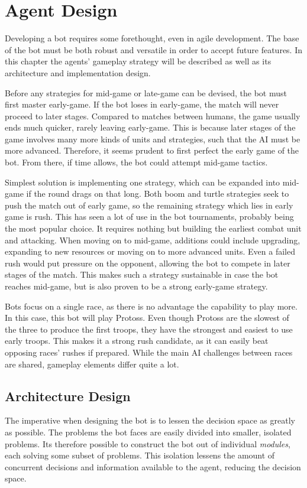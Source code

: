 \chapter{Agent Design}
Developing a bot requires some forethought, even in agile development. The base of the bot must be both robust and versatile in order to accept future features. In this chapter the agents' gameplay strategy will be described as well as its architecture and implementation design.

Before any strategies for mid-game or late-game can be devised, the bot must first master early-game. If the bot loses in early-game, the match will never proceed to later stages. Compared to matches between humans, the game usually ends much quicker, rarely leaving early-game. This is because later stages of the game involves many more kinds of units and strategies, such that the AI must be more advanced. Therefore, it seems prudent to first perfect the early game of the bot. From there, if time allows, the bot could attempt mid-game tactics.

Simplest solution is implementing one strategy, which can be expanded into mid-game if the round drags on that long. Both boom and turtle strategies seek to push the match out of early game, so the remaining strategy which lies in early game is rush. This has seen a lot of use in the bot tournaments, probably being the most popular choice. It requires nothing but building the earliest combat unit and attacking. When moving on to mid-game, additions could include upgrading, expanding to new resources or moving on to more advanced units. Even a failed rush would put pressure on the opponent, allowing the bot to compete in later stages of the match. This makes such a strategy sustainable in case the bot reaches mid-game, but is also proven to be a strong early-game strategy.

Bots focus on a single race, as there is no advantage the capability to play more. In this case, this bot will play Protoss. Even though Protoss are the slowest of the three to produce the first troops, they have the strongest and easiest to use early troops. This makes it a strong rush candidate, as it can easily beat opposing races' rushes if prepared. While the main AI challenges between races are shared, gameplay elements differ quite a lot.

\section{Architecture Design}
The imperative when designing the bot is to lessen the decision space as greatly as possible. The problems the bot faces are easily divided into smaller, isolated problems. Its therefore possible to construct the bot out of individual \emph{modules}, each solving some subset of problems. This isolation lessens the amount of concurrent decisions and information available to the agent, reducing the decision space.

